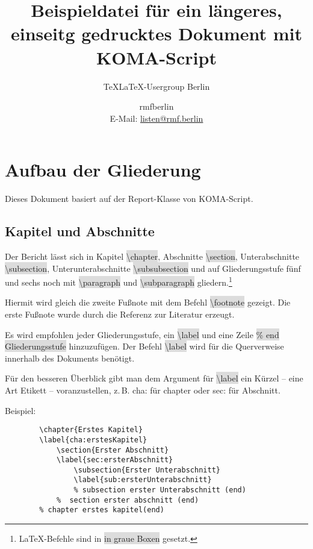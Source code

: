 \documentclass[12pt,	%
				headings=small,		%
				toc=bibliography,	%
			]	%
{scrreprt}		%
\title{Beispieldatei für ein längeres, einseitg gedrucktes Dokument mit KOMA-Script}
\subtitle{TeXLaTeX-Usergroup Berlin}
\author{rmfberlin\\\small{E-Mail: \url{listen@rmf.berlin}}}
\date{\small{\version}}
\newcommand{\inlinecode}[1]{\colorbox{Gainsboro}{\textsf{\textbackslash#1}}} %
\begin{document}
\maketitle
\tableofcontents
\chapter{Aufbau  der Gliederung} %
	\label{cha:1kapitel}
	Dieses Dokument basiert auf der Report-Klasse von KOMA-Script. \autocite{komascript:doku}	%
	\section{Kapitel und Abschnitte}
	\label{sec:KapitelAbschnitte}
			Der Bericht lässt sich in Kapitel \inlinecode{chapter}, Abschnitte \inlinecode{section}, Unterabschnitte \inlinecode{subsection}, Unterunterabschnitte \inlinecode{subsubsection} und auf Gliederungsstufe fünf und sechs noch mit \inlinecode{paragraph} und \inlinecode{subparagraph} gliedern.\footnote{\LaTeX-Befehle sind in \colorbox{Gainsboro}{in graue Boxen} gesetzt.} 
			
			Hiermit wird gleich die zweite Fußnote mit dem Befehl \inlinecode{footnote} gezeigt. Die erste Fußnote wurde durch die Referenz zur Literatur erzeugt.
			
			Es wird empfohlen jeder Gliederungsstufe, ein  \inlinecode{label} und eine Zeile \colorbox{Gainsboro}{\textsf{\% end Gliederungsstufe}} hinzuzufügen. Der Befehl \inlinecode{label} wird für die Querverweise innerhalb des Dokuments benötigt.\autocite[40]{schlosser}
			
			Für den besseren Überblick gibt man dem Argument für \inlinecode{label} ein Kürzel -- eine Art Etikett -- voranzustellen, z.\,B. cha: für chapter oder sec: für Abschnitt.\autocite[71]{schlosser}

	Beispiel:
	
	\begin{lstlisting}
		\chapter{Erstes Kapitel}
		\label{cha:erstesKapitel}
			\section{Erster Abschnitt}
			\label{sec:ersterAbschnitt}
				\subsection{Erster Unterabschnitt}
				\label{sub:ersterUnterabschnitt}
				% subsection erster Unterabschnitt (end)
			%  section erster abschnitt (end)
		% chapter erstes kapitel(end)
	\end{lstlisting}
\end{document}
